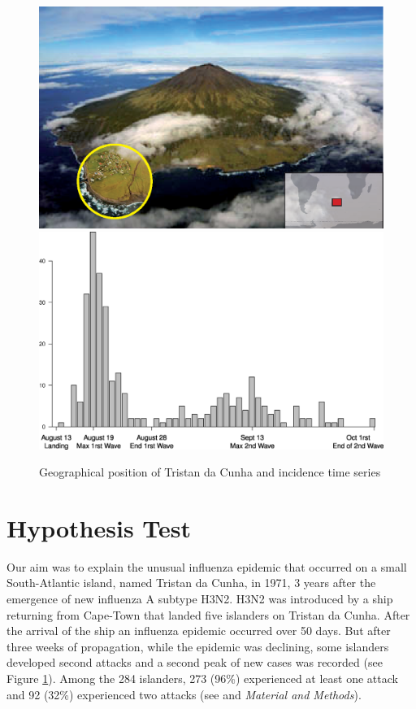 \begin{figure}
\begin{center}
\includegraphics[width=0.7\linewidth]{texte/tdc/graph/tdc.eps}
\includegraphics[width=0.7\linewidth]{texte/tdc/graph/data.eps}
\caption{Geographical position of Tristan da Cunha and incidence time series}
\label{fig:tdc}
\end{center}
\end{figure}


\section{Hypothesis Test}

Our aim was to explain the unusual influenza epidemic that occurred on
a small South-Atlantic island, named Tristan da Cunha, in 1971, 3
years after the emergence of new influenza A subtype H3N2. H3N2 was
introduced by a ship returning from Cape-Town that landed five
islanders on Tristan da Cunha. After the arrival of the ship an
influenza epidemic occurred over 50 days. But after three weeks of
propagation, while the epidemic was declining, some islanders
developed second attacks and a second peak of new cases was recorded
(see Figure \ref{fig:tdc}). Among the 284 islanders, 273 (96\%)
experienced at least one attack and 92 (32\%) experienced two attacks
(see \citet{Mantle1973} and \textsl{Material and Methods}).

